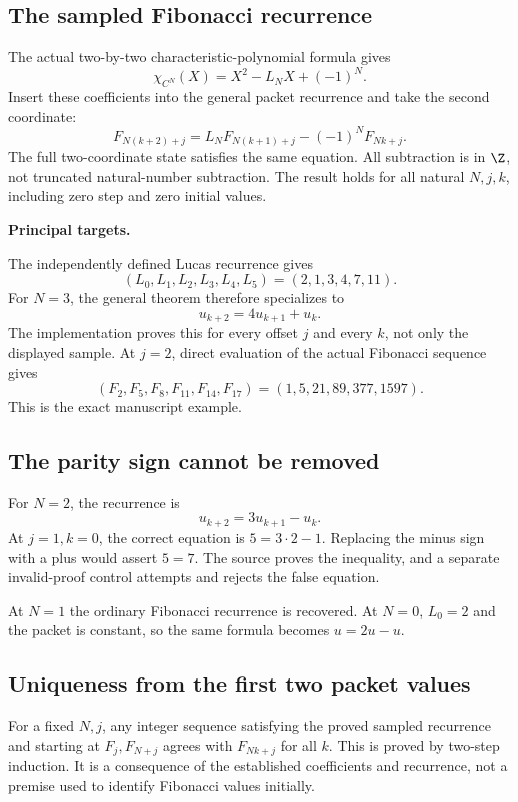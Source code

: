 \subsection*{The sampled Fibonacci recurrence}
The actual two-by-two characteristic-polynomial formula gives
\[
 \chi_{C^N}(X)=X^2-L_NX+(-1)^N.
\]
Insert these coefficients into the general packet recurrence and take the second coordinate:
\[
 \boxed{F_{N(k+2)+j}=L_NF_{N(k+1)+j}-(-1)^NF_{Nk+j}.}
\]
The full two-coordinate state satisfies the same equation. All subtraction is in $\Z$, not truncated natural-number subtraction. The result holds for all natural $N,j,k$, including zero step and zero initial values.

\textbf{Principal targets.}\par
{}\par
{}\par
{}\par
{}
\par\medskip
{}
The independently defined Lucas recurrence gives
\[
 (L_0,L_1,L_2,L_3,L_4,L_5)=(2,1,3,4,7,11).
\]
For $N=3$, the general theorem therefore specializes to
\[
 u_{k+2}=4u_{k+1}+u_k.
\]
The implementation proves this for every offset $j$ and every $k$, not only the displayed sample. At $j=2$, direct evaluation of the actual Fibonacci sequence gives
\[
 (F_2,F_5,F_8,F_{11},F_{14},F_{17})=(1,5,21,89,377,1597).
\]
This is the exact manuscript example.

\subsection*{The parity sign cannot be removed}
For $N=2$, the recurrence is
\[
 u_{k+2}=3u_{k+1}-u_k.
\]
At $j=1,k=0$, the correct equation is $5=3\cdot2-1$. Replacing the minus sign with a plus would assert $5=7$. The source proves the inequality, and a separate invalid-proof control attempts and rejects the false equation.

At $N=1$ the ordinary Fibonacci recurrence is recovered. At $N=0$, $L_0=2$ and the packet is constant, so the same formula becomes $u=2u-u$.

\subsection*{Uniqueness from the first two packet values}
For a fixed $N,j$, any integer sequence satisfying the proved sampled recurrence and starting at $F_j,F_{N+j}$ agrees with $F_{Nk+j}$ for all $k$. This is proved by two-step induction. It is a consequence of the established coefficients and recurrence, not a premise used to identify Fibonacci values initially.

